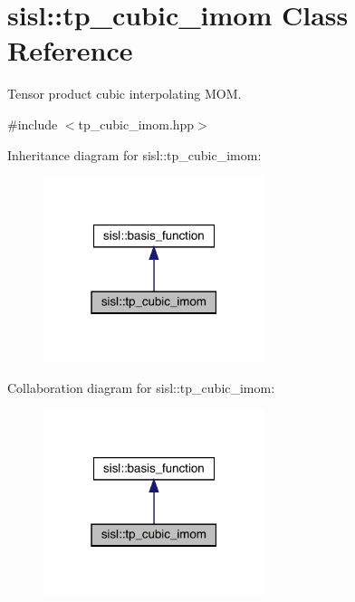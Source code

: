 \hypertarget{classsisl_1_1tp__cubic__imom}{}\section{sisl\+:\+:tp\+\_\+cubic\+\_\+imom Class Reference}
\label{classsisl_1_1tp__cubic__imom}


Tensor product cubic interpolating M\+OM.  




{\ttfamily \#include $<$tp\+\_\+cubic\+\_\+imom.\+hpp$>$}



Inheritance diagram for sisl\+:\+:tp\+\_\+cubic\+\_\+imom\+:\nopagebreak
\begin{figure}[H]
\begin{center}
\leavevmode
\includegraphics[width=183pt]{classsisl_1_1tp__cubic__imom__inherit__graph}
\end{center}
\end{figure}


Collaboration diagram for sisl\+:\+:tp\+\_\+cubic\+\_\+imom\+:\nopagebreak
\begin{figure}[H]
\begin{center}
\leavevmode
\includegraphics[width=183pt]{classsisl_1_1tp__cubic__imom__coll__graph}
\end{center}
\end{figure}

